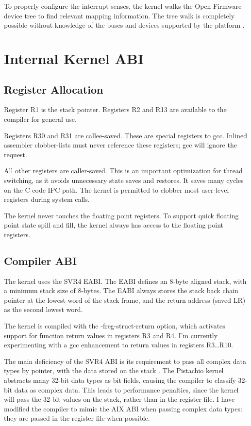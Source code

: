 \documentclass[a4paper]{article}
\newcommand{\openfirmware}{Open Firmware}
\newcommand{\code}[1]{\textsf{#1}}
\begin{document}
To properly configure the interrupt senses, the kernel walks the \openfirmware{}
device tree to find relevant mapping information.  The tree walk is completely
possible without knowledge of the buses and devices supported by the 
platform \cite{ofintmap}.


\section{Internal Kernel ABI}
\subsection{Register Allocation}
Register R1 is the stack pointer.
Registers R2 and R13 are available to the compiler for general use.

Registers R30 and R31 are callee-saved.  These are special registers to gcc.
Inlined assembler clobber-lists must never reference these registers; gcc
will ignore the request.

All other registers are caller-saved.  This is an important optimization for
thread switching, as it avoids unnecessary state saves and restores.  It saves
many cycles on the C code IPC path.  The kernel is permitted to clobber most
user-level registers during system calls.

The kernel never touches the floating point registers.  To support quick
floating point state spill and fill, the kernel always has access to the 
floating point registers.

\subsection{Compiler ABI}
The kernel uses the SVR4 EABI.  The EABI defines an 8-byte aligned stack, with
a minimum stack size of 8-bytes.  The EABI always stores the
stack back chain pointer at the lowest word of the stack frame, and the return
address (saved LR) as the second lowest word.

The kernel is compiled with the \code{-freg-struct-return} option, which 
activates support for function return values in registers R3 and R4.
I'm currently experimenting
with a gcc enhancement to return values in registers R3\dots R10.

The main deficiency of the SVR4 ABI is its requirement to pass all complex
data types by pointer, with the data stored on the stack \cite{ppcsvr4}.  
The Pistachio 
kernel abstracts many 32-bit data types as bit fields, causing the compiler
to classify 32-bit data as complex data.  This leads to performance penalties,
since the kernel will pass the 32-bit values on the stack, rather than in
the register file.  I have modified the compiler to mimic the AIX ABI
when passing complex data types: they are passed in the register file when
possible.
\end{document}
